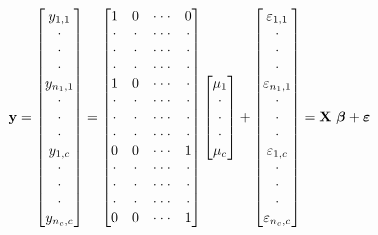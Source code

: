 \begin{equation}\label{E4:MatrixOneFactor}
\mathbf{y}=%
\begin{bmatrix}
y_{1,1} \\
\cdot  \\
\cdot  \\
\cdot  \\
y_{n_{1},1} \\
\cdot  \\
\cdot  \\
\cdot  \\
y_{1,c} \\
\cdot  \\
\cdot  \\
\cdot  \\
y_{n_{c},c}%
\end{bmatrix}%
=%
\begin{bmatrix}
1 & 0 & \cdot \cdot \cdot  & 0 \\
\cdot  & \cdot  & \cdot \cdot \cdot  & \cdot  \\
\cdot  & \cdot  & \cdot \cdot \cdot  & \cdot  \\
\cdot  & \cdot  & \cdot \cdot \cdot  & \cdot  \\
1 & 0 & \cdot \cdot \cdot  & \cdot  \\
\cdot  & \cdot  & \cdot \cdot \cdot  & \cdot  \\
\cdot  & \cdot  & \cdot \cdot \cdot  & \cdot  \\
\cdot  & \cdot  & \cdot \cdot \cdot  & \cdot  \\
0 & 0 & \cdot \cdot \cdot  & 1 \\
\cdot  & \cdot  & \cdot \cdot \cdot  & \cdot  \\
\cdot  & \cdot  & \cdot \cdot \cdot  & \cdot  \\
\cdot  & \cdot  & \cdot \cdot \cdot  & \cdot  \\
0 & 0 & \cdot \cdot \cdot  & 1%
\end{bmatrix}%
\begin{bmatrix}
\mu _{1} \\
\cdot  \\
\cdot  \\
\cdot  \\
\mu _{c}%
\end{bmatrix}%
+%
\begin{bmatrix}
\varepsilon_{1,1} \\
\cdot  \\
\cdot  \\
\cdot  \\
\varepsilon_{n_{1},1} \\
\cdot  \\
\cdot  \\
\cdot  \\
\varepsilon_{1,c} \\
\cdot  \\
\cdot  \\
\cdot  \\
\varepsilon_{n_{c},c}%
\end{bmatrix}%
=\mathbf{X\ \boldsymbol \beta + \boldsymbol \varepsilon} \text{\ \ \
\ }
\end{equation}



